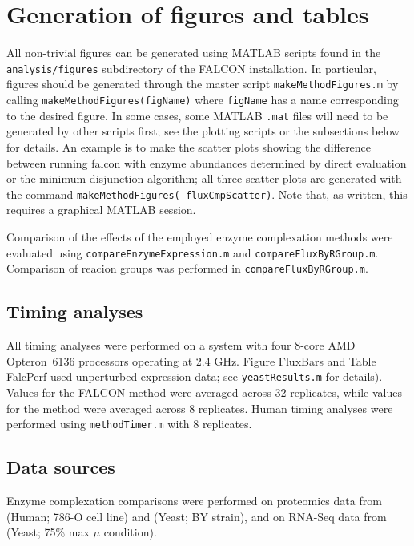 \section{Generation of figures and tables}

All non-trivial figures can be generated using MATLAB scripts found in
the \texttt{analysis/figures} subdirectory of the FALCON installation.
In particular, figures should be generated through the master script
\texttt{makeMethodFigures.m} by calling
\texttt{makeMethodFigures(figName)} where \texttt{figName} has a name
corresponding to the desired figure.  In some cases, some MATLAB
\texttt{.mat} files will need to be generated by other scripts first;
see the plotting scripts or the subsections below for details. An
example is to make the scatter plots showing the difference between
running falcon with enzyme abundances determined by direct evaluation
or the minimum disjunction algorithm; all three scatter plots are
generated with the command \texttt{makeMethodFigures(\textquotesingle
fluxCmpScatter\textquotesingle)}. Note that, as written, this requires
a graphical MATLAB session.

Comparison of the effects of the employed enzyme complexation methods
were evaluated using \texttt{compareEnzymeExpression.m} and 
\texttt{compareFluxByRGroup.m}. Comparison of reacion groups was
performed in \texttt{compareFluxByRGroup.m}.

\subsection{Timing analyses}
All timing analyses were performed on a system with four 8-core AMD
Opteron\texttrademark\ 6136 processors operating at 2.4 GHz. Figure
FluxBars and Table FalcPerf used unperturbed expression data; see
\texttt{yeastResults.m} for details). Values for the FALCON method
were averaged across 32 replicates, while values for the
\citealt{Lee2012} method were averaged across 8 replicates. Human
timing analyses were performed using \texttt{methodTimer.m} with
8 replicates.

\subsection{Data sources}
Enzyme complexation comparisons were performed on proteomics data
from \citealt{Gholami2013} (Human; 786-O cell line) and 
\citealt{Picotti2013} (Yeast; BY strain), and on RNA-Seq data
from \citealt{Lee2012} (Yeast; 75\% max $\mu$ condition).